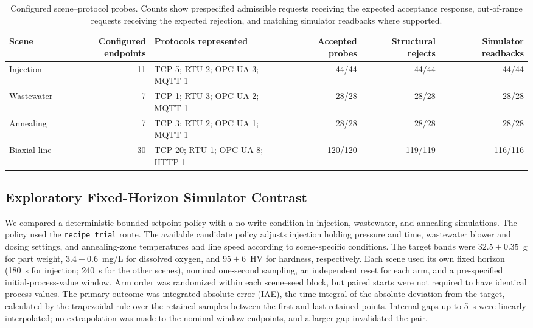 \begin{table}[!t]
\centering
\caption{Configured scene--protocol probes. Counts show prespecified admissible requests receiving the expected acceptance response, out-of-range requests receiving the expected rejection, and matching simulator readbacks where supported.}
\label{tab:scene-probe-results}
\footnotesize
\setlength{\tabcolsep}{3pt}
\begin{tabularx}{\textwidth}{@{}>{\raggedright\arraybackslash}p{1.55cm}r X r r r@{}}
\toprule
Scene & Configured endpoints & Protocols represented & Accepted probes & Structural rejects & Simulator readbacks \\
\midrule
Injection & 11 & TCP 5; RTU 2; OPC UA 3; MQTT 1 & 44/44 & 44/44 & 44/44 \\
Wastewater & 7 & TCP 1; RTU 3; OPC UA 2; MQTT 1 & 28/28 & 28/28 & 28/28 \\
Annealing & 7 & TCP 3; RTU 2; OPC UA 1; MQTT 1 & 28/28 & 28/28 & 28/28 \\
Biaxial line & 30 & TCP 20; RTU 1; OPC UA 8; HTTP 1 & 120/120 & 119/119 & 116/116 \\
\bottomrule
\end{tabularx}
\end{table}

\subsection{Exploratory Fixed-Horizon Simulator Contrast}
\label{sec:eval-optimization}
We compared a deterministic bounded setpoint policy with a no-write condition in injection, wastewater, and annealing simulations. The policy used the \texttt{recipe\_trial} route. The available candidate policy adjusts injection holding pressure and time, wastewater blower and dosing settings, and annealing-zone temperatures and line speed according to scene-specific conditions. The target bands were $32.5\pm0.35$~g for part weight, $3.4\pm0.6$~mg/L for dissolved oxygen, and $95\pm6$~HV for hardness, respectively. Each scene used its own fixed horizon (180~s for injection; 240~s for the other scenes), nominal one-second sampling, an independent reset for each arm, and a pre-specified initial-process-value window. Arm order was randomized within each scene--seed block, but paired starts were not required to have identical process values. The primary outcome was integrated absolute error (IAE), the time integral of the absolute deviation from the target, calculated by the trapezoidal rule over the retained samples between the first and last retained points. Internal gaps up to 5~s were linearly interpolated; no extrapolation was made to the nominal window endpoints, and a larger gap invalidated the pair.

